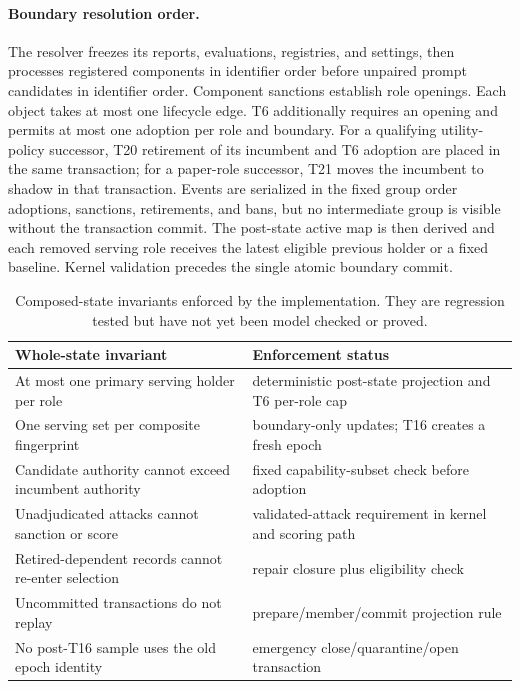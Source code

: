 \paragraph{Boundary resolution order.}
The resolver freezes its reports, evaluations, registries, and settings,
then processes registered components in identifier order before unpaired
prompt candidates in identifier order. Component sanctions establish role
openings. Each object takes at most one lifecycle edge. T6 additionally
requires an opening and permits at most one adoption per role and boundary.
For a qualifying utility-policy successor, T20 retirement of its incumbent
and T6 adoption are placed in the same transaction; for a paper-role
successor, T21 moves the incumbent to shadow in that transaction. Events
are serialized in the fixed group order adoptions, sanctions, retirements,
and bans, but no intermediate group is visible without the transaction
commit. The post-state active map is then derived and each removed serving
role receives the latest eligible previous holder or a fixed baseline.
Kernel validation precedes the single atomic boundary commit.

\begin{table}[htbp]
  \centering
  \small
  \begin{tabularx}{\textwidth}{@{}p{}X@{}}
    \toprule
    \textbf{Whole-state invariant} & \textbf{Enforcement status} \\
    \midrule
    At most one primary serving holder per role &
      deterministic post-state projection and T6 per-role cap \\
    One serving set per composite fingerprint &
      boundary-only updates; T16 creates a fresh epoch \\
    Candidate authority cannot exceed incumbent authority &
      fixed capability-subset check before adoption \\
    Unadjudicated attacks cannot sanction or score &
      validated-attack requirement in kernel and scoring path \\
    Retired-dependent records cannot re-enter selection &
      repair closure plus eligibility check \\
    Uncommitted transactions do not replay &
      prepare/member/commit projection rule \\
    No post-T16 sample uses the old epoch identity &
      emergency close/quarantine/open transaction \\
    \bottomrule
  \end{tabularx}
  \caption{Composed-state invariants enforced by the implementation. They
  are regression tested but have not yet been model checked or proved.}
  \label{tab:whole-state-invariants}
\end{table}

